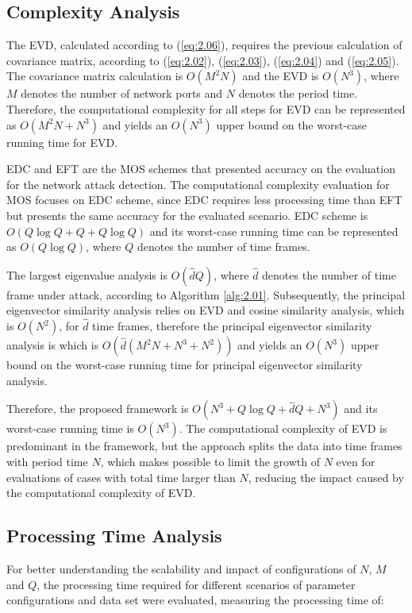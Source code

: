\subsection{Complexity Analysis}
\label{sec:2_ComplexityAnalysis}
The EVD, calculated according to (\ref{eq:2.06}), requires the previous calculation of covariance matrix, according to (\ref{eq:2.02}), (\ref{eq:2.03}), (\ref{eq:2.04}) and (\ref{eq:2.05}). The covariance matrix calculation is $O(M^2N)$ and the EVD is $O(N^3)$, where $M$ denotes the number of network ports and $N$ denotes the period time. Therefore, the computational complexity for all steps for EVD can be represented as $O(M^2N + N^3)$ and yields an $O(N^3)$ upper bound on the worst-case running time for EVD.

EDC and EFT are the MOS schemes that presented accuracy on the evaluation for the network attack detection. The computational complexity evaluation for MOS focuses on EDC scheme, since EDC requires less processing time than EFT but presents the same accuracy for the evaluated scenario. EDC scheme is $O(Q \log Q + Q + Q \log Q)$ and its worst-case running time can be represented as $O(Q \log Q)$, where $Q$ denotes the number of time frames.

The largest eigenvalue analysis is $O(\hat{d}Q)$, where $\hat{d}$ denotes the number of time frame under attack, according to Algorithm \ref{alg:2.01}. Subsequently, the principal eigenvector similarity analysis relies on EVD and cosine similarity analysis, which is $O(N^2)$, for $\hat{d}$ time frames, therefore the principal eigenvector similarity analysis is which is $O(\hat{d}(M^2N + N^3 + N^2))$ and yields an $O(N^3)$ upper bound on the worst-case running time for principal eigenvector similarity analysis.

Therefore, the proposed framework is $O(N^3 + Q \log Q + \hat{d}Q + N^3)$ and its worst-case running time is $O(N^3)$. The computational complexity of EVD is predominant in the framework, but the approach splits the data into time frames with period time $N$, which makes possible to limit the growth of $N$ even for evaluations of cases with total time larger than $N$, reducing the impact caused by the computational complexity of EVD.

\subsection{Processing Time Analysis}
\label{sec:2_ProcessingAnalysis}
For better understanding the scalability and impact of configurations of $N$, $M$ and $Q$, the processing time required for different scenarios of parameter configurations and data set were evaluated, measuring the processing time of: 

